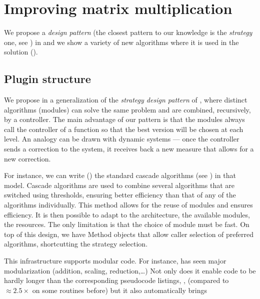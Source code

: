 \section{Improving \linbox matrix multiplication}\label{sec:matmul}
%
We propose a \emph{design pattern} (the closest pattern to our knowledge is the
\emph{strategy} one, see \cite[Fig 2.]{Cung:2006:TC}) in  and
we show a variety of new algorithms where it is used in the \mul  solution
().
%
\subsection{Plugin structure}\label{ssec:plugin}
%
We propose in  a generalization of the \emph{strategy
  design pattern} of \cite[Fig 2.]{Cung:2006:TC}, where distinct
algorithms (modules) can solve the 
same problem and are combined, recursively, by a controller.
The main advantage of our pattern is that the modules always call
the controller of a function so that the best version will be chosen
at each level.
An analogy can be drawn with dynamic systems --- once the controller sends a
correction to the system, it receives back a new measure that allows for a new
correction.
%
\par

%
%
%
%
For instance, we can write () the standard cascade algorithms
(see \cite{Dumas:2008:Flas}) in that model. Cascade algorithms are used to combine
several algorithms that are switched using thresholds, ensuring better
efficiency than that of any of the algorithms individually.
%
%
%
This method allows for the reuse of modules and ensures efficiency.
It is then possible to adapt to the architecture, the available modules,
the resources. The only limitation is that the choice of module
must be fast.
%
%
On top of this design, we have Method objects that allow caller selection
of preferred algorithms, shortcutting the strategy selection.
%

%
%
\par
%
This infrastructure supports modular code. For instance,
\fflasffpack has seen major  modularization (addition, scaling,
reduction,\ldots) Not only does it enable code to be hardly longer than
the corresponding pseudocode listings, \cite{Boyer:2009:sched}, (compared to
$\approx 2.5\times$ on some routines before) but it also automatically brings
